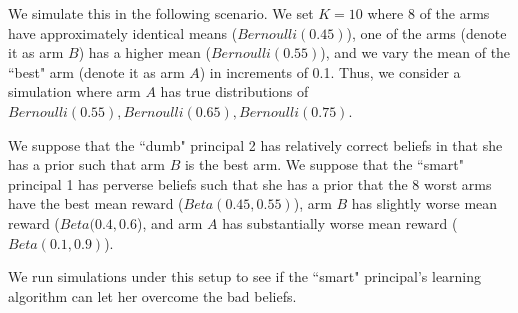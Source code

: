 \documentclass[11pt,letterpaper]{article}
\begin{document}
We simulate this in the following scenario. We set $K = 10$ where 8 of the arms have approximately identical means ($Bernoulli(0.45)$), one of the arms (denote it as arm $B$) has a higher mean ($Bernoulli(0.55)$), and we vary the mean of the ``best" arm (denote it as arm $A$) in increments of 0.1. Thus, we consider a simulation where arm $A$ has true distributions of $Bernoulli(0.55), Bernoulli(0.65), Bernoulli(0.75)$.

We suppose that the ``dumb" principal 2 has relatively correct beliefs in that she has a prior such that arm $B$ is the best arm. We suppose that the ``smart" principal 1 has perverse beliefs such that she has a prior that the 8 worst arms have the best mean reward ($Beta(0.45, 0.55)$), arm $B$ has slightly worse mean reward ($Beta(0.4, 0.6$), and arm $A$ has substantially worse mean reward ($Beta(0.1, 0.9)$).

We run simulations under this setup to see if the ``smart" principal's learning algorithm can let her overcome the bad beliefs.
\end{document}
